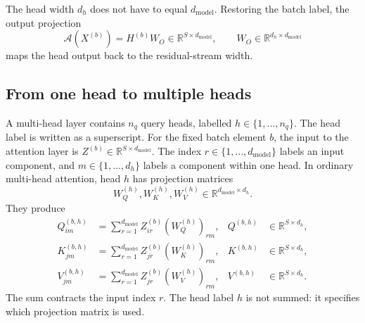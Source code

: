 \documentclass[11pt]{article}
\newcommand{\R}{\mathbb{R}}
\begin{document}
The head width $d_h$ does not have to equal $d_{\mathrm{model}}$.  Restoring
the batch label, the output projection
\begin{equation}
  \mathcal{A}(X^{(b)})=H^{(b)}W_O
  \in\R^{S\times d_{\mathrm{model}}},
  \qquad
  W_O\in\R^{d_h\times d_{\mathrm{model}}}
\end{equation}
maps the head output back to the residual-stream width.

\subsection{From one head to multiple heads}
\label{sec:multihead}

A multi-head layer contains $n_q$ query heads, labelled
$h\in\{1,\ldots,n_q\}$.  The head label is written as a superscript.  For the
fixed batch element $b$, the input to the attention layer is
$Z^{(b)}\in\R^{S\times d_{\mathrm{model}}}$.  The index
$r\in\{1,\ldots,d_{\mathrm{model}}\}$ labels an input component, and
$m\in\{1,\ldots,d_h\}$ labels a component within one head.  In ordinary
multi-head attention, head $h$ has projection matrices
\[
  W_Q^{(h)},W_K^{(h)},W_V^{(h)}
  \in\R^{d_{\mathrm{model}}\times d_h}.
\]
They produce
\begin{align}
  Q_{im}^{(b,h)}
  &=\sum_{r=1}^{d_{\mathrm{model}}}
    Z_{ir}^{(b)}(W_Q^{(h)})_{rm},
  &Q^{(b,h)}&\in\R^{S\times d_h},\\
  K_{jm}^{(b,h)}
  &=\sum_{r=1}^{d_{\mathrm{model}}}
    Z_{jr}^{(b)}(W_K^{(h)})_{rm},
  &K^{(b,h)}&\in\R^{S\times d_h},\\
  V_{jm}^{(b,h)}
  &=\sum_{r=1}^{d_{\mathrm{model}}}
    Z_{jr}^{(b)}(W_V^{(h)})_{rm},
  &V^{(b,h)}&\in\R^{S\times d_h}.
\end{align}
The sum contracts the input index $r$.  The head label $h$ is not summed: it
specifies which projection matrix is used.
\end{document}
